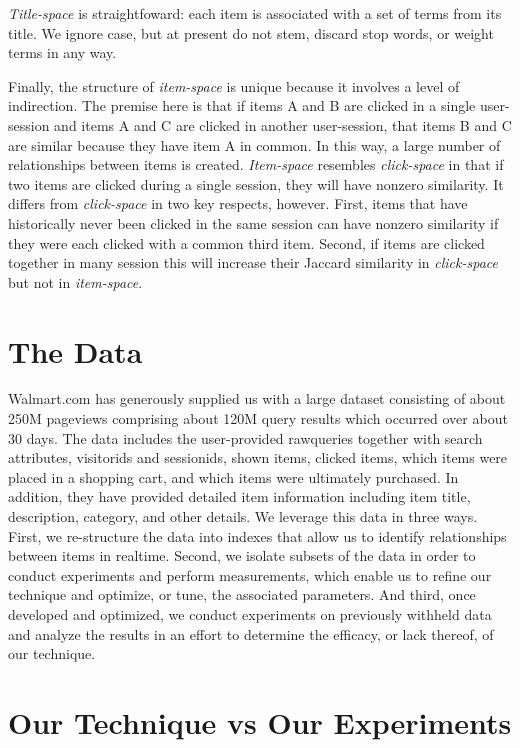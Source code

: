 \documentclass{article}
\begin{document}
{\em Title-space} is straightfoward: each item is associated with a set of terms
from its title. We ignore case, but at present do not stem, discard stop words,
or weight terms in any way. 

Finally, the structure of {\em item-space} is unique because it involves a level
of indirection. The premise here is that if items A and B are clicked in a
single user-session and items A and C are clicked in another user-session, that
items B and C are similar because they have item A in common. In this way, a
large number of relationships between items is created. {\em Item-space}
resembles {\em click-space} in that if two items are clicked during a single
session, they will have nonzero similarity. It differs from {\em click-space} in
two key respects, however. First, items that have historically never been
clicked in the same session can have nonzero similarity if they were each
clicked with a common third item. Second, if items are clicked together in many
session this will increase their Jaccard similarity in {\em click-space} but not
in {\em item-space}.

\section{The Data}

Walmart.com has generously supplied us with a large dataset consisting of about
250M pageviews comprising about 120M query results which occurred over about 30
days. The data includes the user-provided rawqueries together with search
attributes, visitorids and sessionids, shown items, clicked items, which items
were placed in a shopping cart, and which items were ultimately purchased. In
addition, they have provided detailed item information including item title,
description, category, and other details. We leverage this data in three ways.
First, we re-structure the data into indexes that allow us to identify
relationships between items in realtime. Second, we isolate subsets of the data
in order to conduct experiments and perform measurements, which enable us to
refine our technique and optimize, or tune, the associated parameters. And
third, once developed and optimized, we conduct experiments on previously
withheld data and analyze the results in an effort to determine the efficacy, or
lack thereof, of our technique. 

\section{Our Technique vs Our Experiments}
\end{document}

